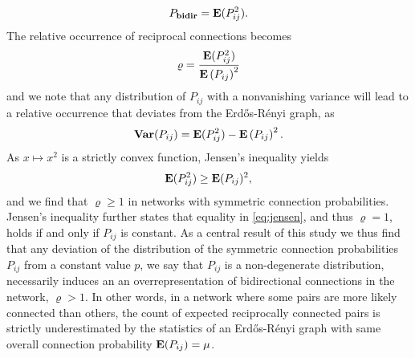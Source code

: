 \begin{align}
P_{\mathbf{bidir}} = \operatorname{\mathbf{E}}(P_{ij}^2).
\end{align}
%
The relative occurrence of reciprocal connections becomes
\begin{align}
\varrho = \frac{\operatorname{\mathbf{E}}(P_{ij}^2)}{{\operatorname{\mathbf{E}}\left(P_{ij}\right)}^2}
\end{align}
and we note that any distribution of $P_{ij}$ with a nonvanishing variance will lead to a relative occurrence that deviates from the Erd\H{o}s-R\'{e}nyi graph, as
\begin{align}
\operatorname{\mathbf{Var}}(P_{ij}) = \operatorname{\mathbf{E}}(P_{ij}^2) - \operatorname{\mathbf{E}}\left(P_{ij}\right)^2.
\end{align}
As $x \mapsto x^2$ is a strictly convex function, Jensen's inequality \cite{Jensen1906, Cover2006} yields
\begin{align}
\operatorname{\mathbf{E}}(P_{ij}^2) \geq \operatorname{\mathbf{E}}(P_{ij})^2, \label{eq:jensen}
\end{align}
and we find that $\varrho \geq 1$ in networks with symmetric connection probabilities. Jensen's inequality further states that equality in \eqref{eq:jensen}, and thus $\varrho = 1$, holds if and only if $P_{ij}$ is constant. As a central result of this study we thus find that any deviation of the distribution of the symmetric connection probabilities $P_{ij}$ from a constant value $p$, we say that $P_{ij}$ is a non-degenerate distribution, necessarily induces an an overrepresentation of bidirectional connections in the network, $\varrho > 1$. In other words, in a network where some pairs are more likely connected than others, the count of expected reciprocally connected pairs is strictly underestimated by the statistics of an Erd\H{o}s-R\'{e}nyi graph with same overall connection probability $\operatorname{\mathbf{E}}(P_{ij}) = \mu$.






